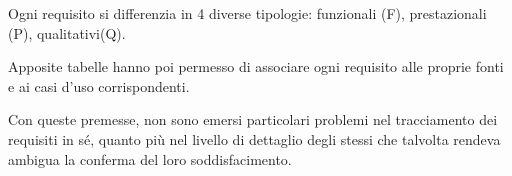 Ogni requisito si differenzia in 4 diverse tipologie: funzionali (F), prestazionali (P), qualitativi(Q).

Apposite tabelle hanno poi permesso di associare ogni requisito alle proprie fonti e ai casi d’uso corrispondenti. 

Con queste premesse, non sono emersi particolari problemi nel tracciamento dei requisiti in sé, quanto più nel livello di dettaglio degli stessi che talvolta rendeva ambigua la conferma del loro soddisfacimento.